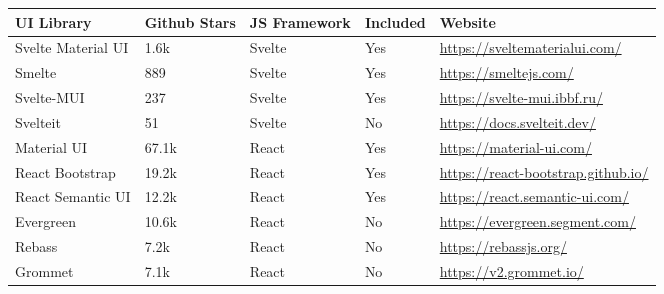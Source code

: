 \begin{table*}[t]
	\begin{tabularx}{\textwidth}{l|l|l|l|X}
		\toprule
		\textbf{UI Library}     & \textbf{Github Stars} & \textbf{JS Framework} & \textbf{Included} & \textbf{Website}                                                                 \\ \midrule
		Svelte Material UI      & 1.6k                  & Svelte                & Yes               & \url{https://sveltematerialui.com/}                                              \\ \hline
		Smelte                  & 889                   & Svelte                & Yes               & \url{https://smeltejs.com/}                                                      \\ \hline
		Svelte-MUI              & 237                   & Svelte                & Yes               & \url{https://svelte-mui.ibbf.ru/}                                                \\ \hline
		Svelteit                & 51                    & Svelte                & No                & \url{https://docs.svelteit.dev/}                                                 \\ \hline
		Material UI             & 67.1k                 & React                 & Yes               & \url{https://material-ui.com/}                                                   \\ \hline
		React Bootstrap         & 19.2k                 & React                 & Yes               & \url{https://react-bootstrap.github.io/}                                         \\ \hline
		React Semantic UI       & 12.2k                 & React                 & Yes               & \url{https://react.semantic-ui.com/}                                             \\ \hline
		Evergreen               & 10.6k                 & React                 & No                & \url{https://evergreen.segment.com/}                                             \\ \hline
		Rebass                  & 7.2k                  & React                 & No                & \url{https://rebassjs.org/}                                                      \\ \hline
		Grommet                 & 7.1k                  & React                 & No                & \url{https://v2.grommet.io/}                                                     \\ \hline

\end{tabularx}
\end{table*}
